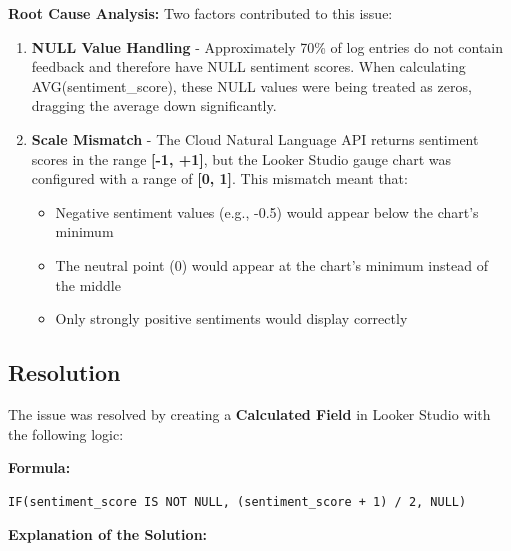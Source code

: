 \documentclass[12pt,a4paper]{article}
\begin{document}
\textbf{Root Cause Analysis:}
Two factors contributed to this issue:

\begin{enumerate}
    \item \textbf{NULL Value Handling} - Approximately 70\% of log entries do not contain feedback and therefore have NULL sentiment scores. When calculating AVG(sentiment\_score), these NULL values were being treated as zeros, dragging the average down significantly.
    
    \item \textbf{Scale Mismatch} - The Cloud Natural Language API returns sentiment scores in the range \textbf{[-1, +1]}, but the Looker Studio gauge chart was configured with a range of \textbf{[0, 1]}. This mismatch meant that:
    \begin{itemize}
        \item Negative sentiment values (e.g., -0.5) would appear below the chart's minimum
        \item The neutral point (0) would appear at the chart's minimum instead of the middle
        \item Only strongly positive sentiments would display correctly
    \end{itemize}
\end{enumerate}

\subsection{Resolution}

The issue was resolved by creating a \textbf{Calculated Field} in Looker Studio with the following logic:

\textbf{Formula:}
\begin{verbatim}
IF(sentiment_score IS NOT NULL, (sentiment_score + 1) / 2, NULL)
\end{verbatim}

\textbf{Explanation of the Solution:}
\end{document}
